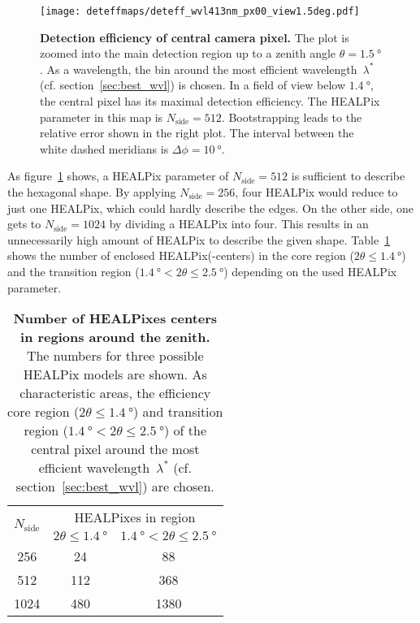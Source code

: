 \begin{figure}[H]
	\centering
	\texttt{[image: deteffmaps/deteff\_wvl413nm\_px00\_view1.5deg.pdf]}
	\caption[Detection efficiency of central camera pixel]{\textbf{Detection efficiency of central camera pixel.} The plot is zoomed into the main detection region up to a zenith angle $\theta=\SI{1.5}{\degree}$. As a wavelength, the bin around the most efficient wavelength~$\lambda^\ast$ (cf. section~\ref{sec:best_wvl}) is chosen. In a field of view below $\SI{1.4}{\degree}$, the central pixel has its maximal detection efficiency. The HEALPix parameter in this map is $N_\text{side}=\num{512}$. Bootstrapping leads to the relative error shown in the right plot. The interval between the white dashed meridians is $\Delta\phi=\SI{10}{\degree}$.}
	\label{deteffmap:px0}
\end{figure}

As figure~\ref{deteffmap:px0} shows, a HEALPix parameter of $N_\text{side}=\num{512}$ is sufficient to describe the hexagonal shape. By applying $N_\text{side}=\num{256}$, four HEALPix would reduce to just one HEALPix, which could hardly describe the edges. On the other side, one gets to $N_\text{side}=\num{1024}$ by dividing a HEALPix into four. This results in an unnecessarily high amount of HEALPix to describe the given shape. Table~\ref{n_healpix_fov} shows the number of enclosed HEALPix(-centers) in the core region ($2\theta\leq\SI{1.4}{\degree}$) and the transition region ($\SI{1.4}{\degree} < 2\theta \leq \SI{2.5}{\degree}$) depending on the used HEALPix parameter.

\begin{table}[H]
	\centering
	\begin{tabular}{c|c|c}
		\toprule
		\multirow{2}{*}{$N_\text{side}$} & \multicolumn{2}{c}{HEALPixes in region} \\
		&	$2\theta\leq\SI{1.4}{\degree}$ & $\SI{1.4}{\degree} < 2\theta \leq \SI{2.5}{\degree}$ \\
		\midrule
		\num{256}  & \num{24}  & \num{88} \\
		\num{512}  & \num{112} & \num{368} \\
		\num{1024} & \num{480} & \num{1380} \\
		\bottomrule
	\end{tabular}
	\caption[Number of HEALPixes centers in regions around the zenith]{\textbf{Number of HEALPixes centers in regions around the zenith.} The numbers for three possible HEALPix models are shown. As characteristic areas, the efficiency core region ($2\theta\leq\SI{1.4}{\degree}$) and transition region ($\SI{1.4}{\degree} < 2\theta \leq \SI{2.5}{\degree}$) of the central pixel around the most efficient wavelength~$\lambda^\ast$ (cf. section~\ref{sec:best_wvl}) are chosen.}
	\label{n_healpix_fov}
\end{table}

